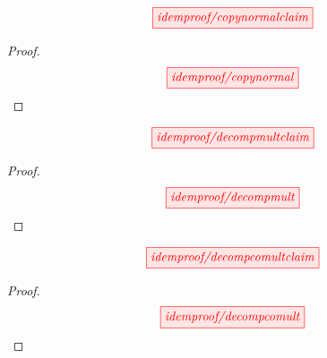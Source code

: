 \begin{myboxR}
\begin{lemma}\label{lem:ecopynormal}
\[\scalebox{1}{\tikzfig{idemproof/copynormalclaim}}\]
\begin{proof}
\[\scalebox{1}{\tikzfig{idemproof/copynormal}}\]
\end{proof}
\end{lemma}
\end{myboxR}

\begin{myboxB}
\begin{proposition}\label{prop:decompmult}
\[\scalebox{1}{\tikzfig{idemproof/decompmultclaim}}\]
\begin{proof}
\[\scalebox{1}{\tikzfig{idemproof/decompmult}}\]
\end{proof}
\end{proposition}
\end{myboxB}

\begin{myboxR}
\begin{proposition}\label{prop:decompcomult}
\[\scalebox{1}{\tikzfig{idemproof/decompcomultclaim}}\]
\begin{proof}
\[\scalebox{1}{\tikzfig{idemproof/decompcomult}}\]
\end{proof}
\end{proposition}
\end{myboxR}

